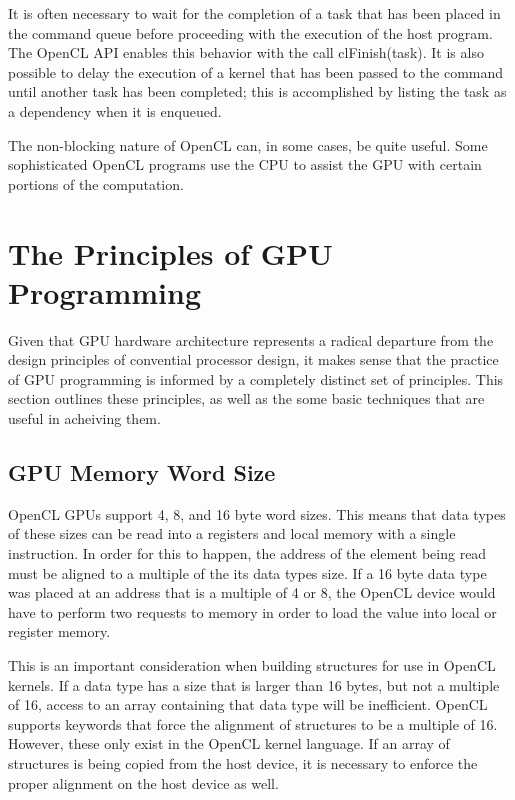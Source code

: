 \documentclass[12pt,twoside]{reedthesis}
\begin{document}
It is often necessary to wait for the completion of a task that has been placed in the command queue before proceeding with the execution of the host program. The OpenCL API enables this behavior with the call clFinish(task). It is also possible to delay the execution of a kernel that has been passed to the command until another task has been completed; this is accomplished by listing the task as a dependency when it is enqueued.

The non-blocking nature of OpenCL can, in some cases, be quite useful. Some sophisticated OpenCL programs use the CPU to assist the GPU with certain portions of the computation.


\section{The Principles of GPU Programming}

Given that GPU hardware architecture represents a radical departure from the design principles of convential processor design, it makes sense that the practice of GPU programming is informed by a completely distinct set of principles. This section outlines these principles, as well as the some basic techniques that are useful in acheiving them.

\subsection{GPU Memory Word Size}

OpenCL GPUs support 4, 8, and 16 byte word sizes. This means that data types of these sizes can be read into a registers and local memory with a single instruction. In order for this to happen, the address of the element being read must be aligned to a multiple of the its data types size. If a 16 byte data type was placed at an address that is a multiple of 4 or 8, the OpenCL device would have to perform two requests to memory in order to load the value into local or register memory.

This is an important consideration when building structures for use in OpenCL kernels. If a data type has a size that is larger than 16 bytes, but not a multiple of 16, access to an array containing that data type will be inefficient. OpenCL supports keywords that force the alignment of structures to be a multiple of 16. However, these only exist in the OpenCL kernel language. If an array of structures is being copied from the host device, it is necessary to enforce the proper alignment on the host device as well.
\end{document}
